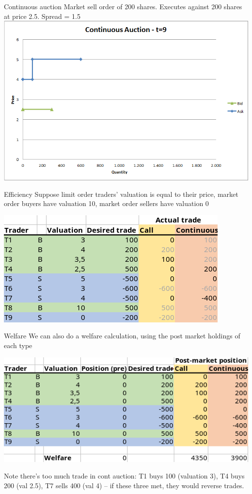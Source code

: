 \documentclass[english,10pt
,aspectratio=169
]{beamer}
\begin{document}
\begin{frame}{Continuous auction}
	Market sell order of 200 shares. Executes against 200 shares at price 2.5. Spread = 1.5
	\center
	\includegraphics[width=.75\linewidth]{pics/Continuous_t9}
\end{frame}


\begin{frame}{Efficiency}
	Suppose limit order traders' valuation is equal to their price, market order buyers have valuation 10, market order sellers have valuation 0
	
	{\center
		\includegraphics[width=.6\linewidth]{pics/Efficiency4}
	\\
	}
	
\end{frame}


\begin{frame}{Welfare}
	We can also do a welfare calculation, using the post market holdings of each type
	
	{\center
	\includegraphics[width=.6\linewidth]{pics/Welfare4}
	\\
	}
	
	Note there's too much trade in cont auction: T1 buys 100 (valuation 3), T4 buys 200 (val 2.5), T7 sells 400 (val 4) -- if these three met, they would reverse trades.
\end{frame}
\end{document}
